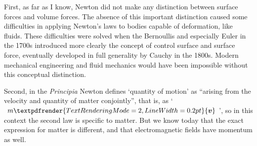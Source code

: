\documentclass[a4paper,12pt,%
onecolumn,oneside,%
british%
]{memoir}
\renewcommand*{\bm}[1]{\textpdfrender{TextRenderingMode=2,LineWidth=0.2pt}{\boldsymbol{#1}}}
\renewcommand*{\|}[1][]{\nonscript\:#1\vert\nonscript\:\mathopen{}}
\begin{document}
First, as far as I know, Newton did not make any distinction between surface forces and volume forces. The absence of this important distinction caused some difficulties in applying Newton's laws to bodies capable of deformation, like fluids. These difficulties were solved when the Bernoullis and especially Euler in the 1700s introduced more clearly the concept of control surface and surface force, eventually developed in full generality by Cauchy in the 1800s. Modern mechanical engineering and fluid mechanics would have been impossible without this conceptual distinction.
%
%


Second, in the \emph{Principia} Newton defines \enquote*{quantity of motion} as \enquote{arising from the velocity and quantity of matter conjointly}, that is, as \enquote*{$m\bm{v}$}, so in this context the second law is specific to matter. But we know today that the exact expression for matter is different, and that electromagnetic fields have momentum as well.
\end{document}
